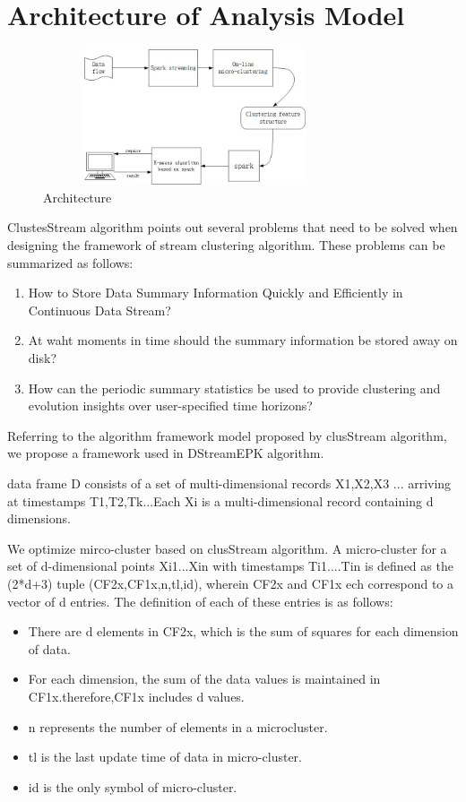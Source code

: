 \documentclass[runningheads]{llncs}
\begin{document}
\section{Architecture of Analysis Model}
\begin{figure}[t]
	\centering
	\includegraphics[height=4cm,width=9cm]{archi.jpg}
	\caption{Architecture} \label{archi}
\end{figure}%
ClustesStream algorithm points out several problems that need to be solved when designing the framework of stream clustering algorithm. These problems can be summarized as follows:
\begin{enumerate}
	\item  How to Store Data Summary Information Quickly and Efficiently in Continuous Data Stream? 
	\item  At waht moments in time should the summary information be stored away on disk?
	\item  How can the periodic summary statistics be used to provide clustering and evolution insights over user-specified time horizons?
\end{enumerate}
Referring to the algorithm framework model proposed by clusStream algorithm, we propose a framework used in DStreamEPK algorithm.

\begin{theorem}
	data frame D consists of a set of multi-dimensional records X1,X2,X3 ... arriving at timestamps T1,T2,Tk...Each Xi is a multi-dimensional record containing d dimensions.
\end{theorem}
\begin{theorem}
	We optimize mirco-cluster based on clusStream algorithm. A micro-cluster for a set of d-dimensional points Xi1...Xin with timestamps Ti1....Tin is defined as the (2*d+3) tuple (CF2x,CF1x,n,tl,id), wherein CF2x and CF1x ech correspond to a vector of d entries. The definition of each of these entries is as follows:
	\begin{itemize}
		\item There are d elements in CF2x, which is the sum of squares for each dimension of data.
		\item For each dimension, the sum of the data values is maintained in CF1x.therefore,CF1x includes d values.
		\item n represents the number of elements in a microcluster. 
		\item tl is the last update time of data in micro-cluster.
		\item id is the only symbol of micro-cluster.
	\end{itemize}
\end{theorem}
\end{document}
